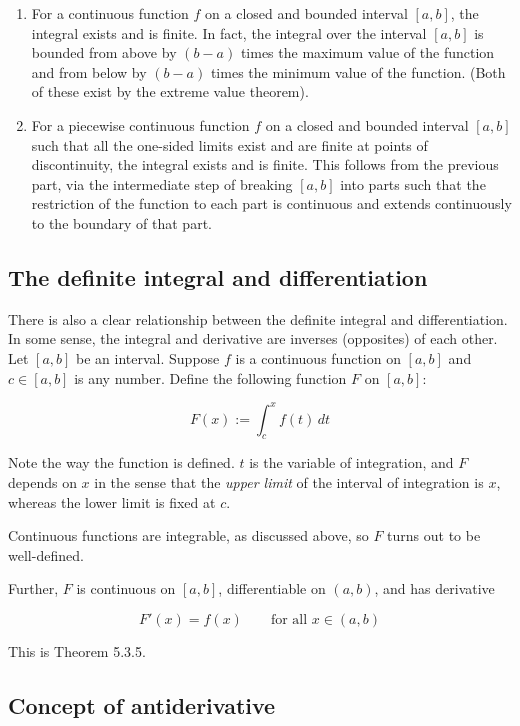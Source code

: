 \documentclass[10pt]{amsart}
\begin{document}
\begin{enumerate}
\item For a continuous function $f$ on a closed and bounded interval
  $[a,b]$, the integral exists and is finite. In fact, the integral
  over the interval $[a,b]$ is bounded from above by $(b - a)$ times
  the maximum value of the function and from below by $(b - a)$ times
  the minimum value of the function. (Both of these exist by the
  extreme value theorem).
\item For a piecewise continuous function $f$ on a closed and bounded
  interval $[a,b]$ such that all the one-sided limits exist and are
  finite at points of discontinuity, the integral exists and is
  finite. This follows from the previous part, via the intermediate
  step of breaking $[a,b]$ into parts such that the restriction of the
  function to each part is continuous and extends continuously to the
  boundary of that part.
\end{enumerate}

\subsection{The definite integral and differentiation}

There is also a clear relationship between the definite integral and
differentiation. In some sense, the integral and derivative are
inverses (opposites) of each other. Let $[a,b]$ be an
interval. Suppose $f$ is a continuous function on $[a,b]$ and $c \in
[a,b]$ is any number. Define the following function $F$ on $[a,b]$:

$$F(x) := \int_c^x f(t) \, dt$$

Note the way the function is defined. $t$ is the variable of
integration, and $F$ depends on $x$ in the sense that the {\em upper
limit} of the interval of integration is $x$, whereas the lower limit
is fixed at $c$.

Continuous functions are integrable, as discussed above, so $F$ turns
out to be well-defined.

Further, $F$ is continuous on $[a,b]$, differentiable on $(a,b)$, and has
derivative

$$F'(x) = f(x) \qquad \text{for all } x \in (a,b)$$

This is Theorem 5.3.5.

\subsection{Concept of antiderivative}
\end{document}

